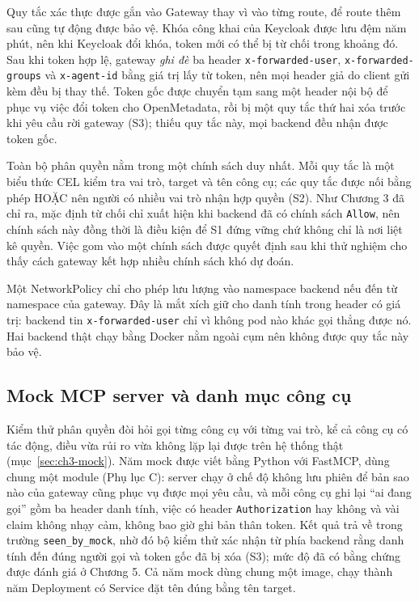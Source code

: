 Quy tắc xác thực được gắn vào Gateway thay vì vào từng route, để route thêm sau cũng tự động được bảo vệ. Khóa công khai của Keycloak được lưu đệm năm phút, nên khi Keycloak đổi khóa, token mới có thể bị từ chối trong khoảng đó. Sau khi token hợp lệ, gateway \emph{ghi đè} ba header \texttt{x-forwarded-user}, \texttt{x-forwarded-groups} và \texttt{x-agent-id} bằng giá trị lấy từ token, nên mọi header giả do client gửi kèm đều bị thay thế. Token gốc được chuyển tạm sang một header nội bộ để phục vụ việc đổi token cho OpenMetadata, rồi bị một quy tắc thứ hai xóa trước khi yêu cầu rời gateway (S3); thiếu quy tắc này, mọi backend đều nhận được token gốc.

Toàn bộ phân quyền nằm trong một chính sách duy nhất. Mỗi quy tắc là một biểu thức CEL kiểm tra vai trò, target và tên công cụ; các quy tắc được nối bằng phép HOẶC nên người có nhiều vai trò nhận hợp quyền (S2). Như Chương 3 đã chỉ ra, mặc định từ chối chỉ xuất hiện khi backend đã có chính sách \texttt{Allow}, nên chính sách này đồng thời là điều kiện để S1 đứng vững chứ không chỉ là nơi liệt kê quyền. Việc gom vào một chính sách được quyết định sau khi thử nghiệm cho thấy cách gateway kết hợp nhiều chính sách khó dự đoán.

Một NetworkPolicy chỉ cho phép lưu lượng vào namespace backend nếu đến từ namespace của gateway. Đây là mắt xích giữ cho danh tính trong header có giá trị: backend tin \texttt{x-forwarded-user} chỉ vì không pod nào khác gọi thẳng được nó. Hai backend thật chạy bằng Docker nằm ngoài cụm nên không được quy tắc này bảo vệ.

\subsection{Mock MCP server và danh mục công cụ}

Kiểm thử phân quyền đòi hỏi gọi từng công cụ với từng vai trò, kể cả công cụ có tác động, điều vừa rủi ro vừa không lặp lại được trên hệ thống thật (mục~\ref{sec:ch3-mock}). Năm mock được viết bằng Python với FastMCP, dùng chung một module (Phụ lục C): server chạy ở chế độ không lưu phiên để bản sao nào của gateway cũng phục vụ được mọi yêu cầu, và mỗi công cụ ghi lại ``ai đang gọi'' gồm ba header danh tính, việc có header \texttt{Authorization} hay không và vài claim không nhạy cảm, không bao giờ ghi bản thân token. Kết quả trả về trong trường \texttt{seen\_by\_mock}, nhờ đó bộ kiểm thử xác nhận từ phía backend rằng danh tính đến đúng người gọi và token gốc đã bị xóa (S3); mức độ đã có bằng chứng được đánh giá ở Chương 5. Cả năm mock dùng chung một image, chạy thành năm Deployment có Service đặt tên đúng bằng tên target.

